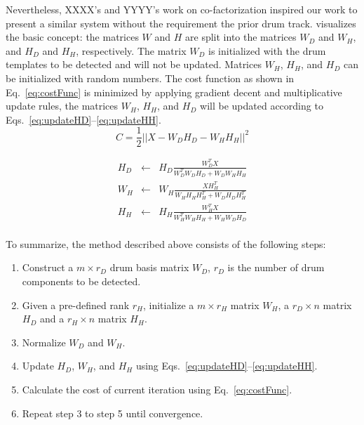 \documentclass{article}
\begin{document}
Nevertheless, XXXX's and YYYY's work on co-factorization inspired our work to present a similar system without the requirement the prior drum track.  visualizes the basic concept: the matrices $W$ and $H$ are split into the  matrices $W_D$ and $W_H$, and  $H_D$ and $H_H$, respectively. 
The matrix $W_D$ is initialized with the drum templates to be detected and will not be updated. Matrices $W_H$, $H_H$, and $H_D$ can be initialized with random numbers. 
The cost function as shown in Eq.~\eqref{eq:costFunc} is minimized by applying gradient decent and multiplicative update rules, the matrices  $W_H$, $H_H$, and $H_D$ will be updated according to Eqs.~\eqref{eq:updateHD}--\eqref{eq:updateHH}.  %
\begin{equation}
C = \frac{1}{2} || X - W_{D}H_{D} - W_{H}H_{H}||^{2}
\label{eq:costFunc}
\end{equation}

\begin{eqnarray}\label{eq1}
H_{D} &\leftarrow& H_{D}\frac{W_{D} ^T X}{W_{D}^T W_{D} H_{D} + W_{D} W_{H} H_{H}}\\
\label{eq:updateHD}
%
W_{H} &\leftarrow& W_{H}\frac{X H_{H}^T}{W_{H} H_{H} H_{H}^T + W_{D} H_{D} H_{H}^T}\\
\label{eq:updateWH}
%
H_{H} &\leftarrow& H_{H}\frac{W_{H}^T X}{W_{H}^T W_{H} H_{H} + W_{H} W_{D} H_{D}}
\label{eq:updateHH}
\end{eqnarray}\\


To summarize, the method described above consists of the following steps:
\begin{enumerate}
    \item   Construct a $m \times r_D$ drum basis matrix $W_D$, $r_D$ is the number of drum components to be detected.
    \item   Given a pre-defined rank $r_H$, initialize a $m \times r_H$ matrix $W_H$, a $r_D \times n$ matrix $H_D$ and a $r_H \times n$ matrix $H_H$.
    \item   Normalize $W_D$ and $W_H$. 
    \item   Update $H_D$, $W_H$, and $H_H$ using Eqs.~\eqref{eq:updateHD}--\eqref{eq:updateHH}.
    \item   Calculate the cost of current iteration using Eq.~\eqref{eq:costFunc}.
    \item   Repeat step 3 to step 5 until convergence.
\end{enumerate}
\end{document}
